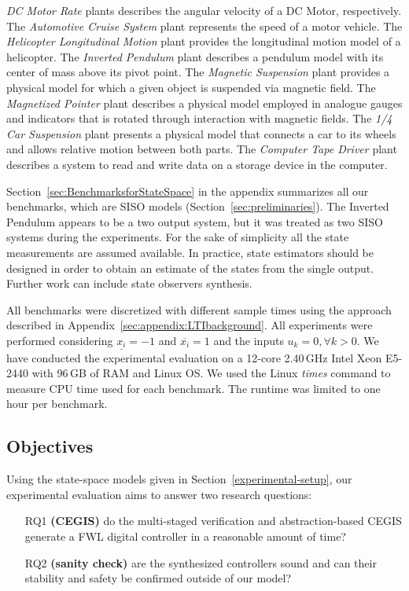 \documentclass[runningheads,a4paper]{llncs}
\begin{document}
\textit{DC Motor Rate} plants describes the angular velocity of a DC Motor, respectively. 
The \textit{Automotive Cruise System} plant represents the speed of a motor vehicle. 
The \textit{Helicopter Longitudinal Motion} plant provides the longitudinal motion model 
of a helicopter. 
The \textit{Inverted Pendulum} plant describes a pendulum model
with its center of mass above its pivot point. 
The \textit{Magnetic Suspension} plant provides a physical model for which 
a given object is suspended via magnetic field. 
The \textit{Magnetized Pointer} plant describes a physical model employed in analogue gauges 
and indicators that is rotated through interaction with magnetic fields.
The \textit{1/4 Car Suspension} plant presents a physical model that connects a car to its wheels 
and allows relative motion between both parts.
The \textit{Computer Tape Driver} plant describes a system to read and write data 
on a storage device in the computer.

Section~\ref{sec:BenchmarksforStateSpace} in the appendix summarizes all our
benchmarks, which are SISO models (Section~\ref{sec:preliminaries}).  The
Inverted Pendulum appears to be a two output system, but it was treated as
two SISO systems during the experiments.  For the sake of simplicity all the
state measurements are assumed available.  In practice, state estimators
should be designed in order to obtain an estimate of the states from the
single output.  Further work can include state observers synthesis.

All benchmarks were discretized with different sample times using 
the approach described in Appendix~\ref{sec:appendix:LTIbackground}. 
All experiments were performed considering $\underline{x_{i}}=-1$ and 
$\overline{x_{i}}=1$ and the inputs $u_{k}=0, \forall k>0$.
We have conducted the experimental evaluation on a 12-core 2.40\,GHz Intel
Xeon E5-2440 with 96\,GB of RAM and Linux OS.  We used the Linux
\emph{times} command to measure CPU time used for each benchmark.  The
runtime was limited to one hour per benchmark.

\subsection{Objectives}

Using the state-space models given in Section~\ref{experimental-setup}, 
our experimental evaluation aims to answer two research questions:
%
\begin{enumerate}

\item[RQ1] \textbf{(CEGIS)} do the multi-staged verification and abstraction-based
CEGIS generate a FWL digital controller in a reasonable amount of time?

\item[RQ2] \textbf{(sanity check)} are the synthesized controllers sound
and can their stability and safety be confirmed outside of our model?

\end{enumerate}
\end{document}
